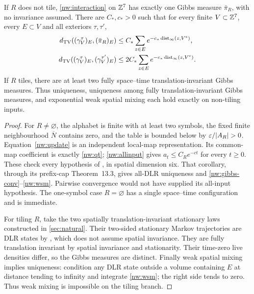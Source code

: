 \begin{corollary}\label{nw:gibbs}
If $R$ does not tile, \eqref{nw:interaction} on $\mathbb{Z}^7$ has exactly one Gibbs measure $\bar\pi_R$, with no invariance assumed. There are $C_*,c_*>0$ such that for every finite $V\subset\mathbb{Z}^7$, every $E\subset V$ and all exteriors $\tau,\tau'$,
\begin{align}
 d_{\mathrm{TV}}((\gamma_V^\tau)_E,(\bar\pi_R)_E)
 &\le C_*\sum_{z\in E}e^{-c_*\operatorname{dist}_\infty(z,V^c)},\label{nw:gibbs-conv}\\
 d_{\mathrm{TV}}((\gamma_V^\tau)_E,(\gamma_V^{\tau'})_E)
 &\le2C_*\sum_{z\in E}e^{-c_*\operatorname{dist}_\infty(z,V^c)}.\label{nw:wsm}
\end{align}
If $R$ tiles, there are at least two fully space--time translation-invariant Gibbs measures. Thus uniqueness, uniqueness among fully translation-invariant Gibbs measures, and exponential weak spatial mixing each hold exactly on non-tiling inputs.
\end{corollary}
\begin{proof}
For $R\ne\varnothing$, the alphabet is finite with at least two symbols, the fixed finite neighbourhood $\overline N$ contains zero, and the table is bounded below by $\eps/|A_R|>0$. Equation~\eqref{nw:update} is an independent local-map representation. Its common-map coefficient is exactly \eqref{nw:qt}; \cref{nw:allinput} gives $a_t\le C_Re^{-ct}$ for every $t\ge0$. These check every hypothesis of \cite[Corollary~13.7]{DM26}, in spatial dimension six. That corollary, through its prefix-cap Theorem~13.3, gives all-DLR uniqueness and \eqref{nw:gibbs-conv}--\eqref{nw:wsm}. Pairwise convergence would not have supplied its all-input hypothesis. The one-symbol case $R=\varnothing$ has a single space--time configuration and is immediate.

For tiling $R$, take the two spatially translation-invariant stationary laws constructed in \cref{sec:natural}. Their two-sided stationary Markov trajectories are DLR states by \cite[Lemma~2.4]{DM26}, which does not assume spatial invariance. They are fully translation invariant by spatial invariance and stationarity. Their time-zero live densities differ, so the Gibbs measures are distinct. Finally weak spatial mixing implies uniqueness: condition any DLR state outside a volume containing $E$ at distance tending to infinity and integrate \eqref{nw:wsm}; the right side tends to zero. Thus weak mixing is impossible on the tiling branch.
\end{proof}

